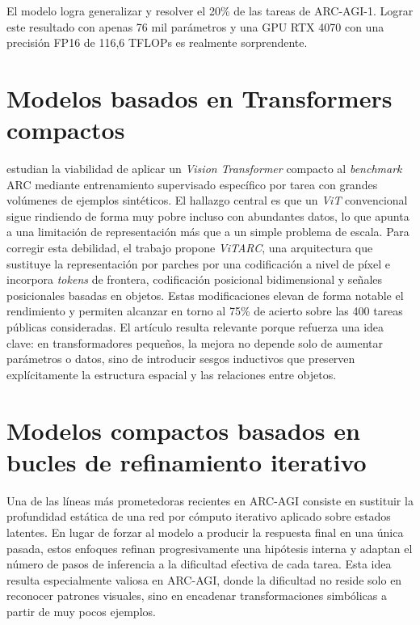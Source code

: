 \documentclass[11pt,a4paper,spanish]{book}
\numberwithin{equation}{chapter}
\numberwithin{figure}{chapter}
\begin{document}
\FloatBarrier

El modelo logra generalizar y resolver el 20\% de las tareas de ARC-AGI-1. Lograr este resultado con apenas 76 mil parámetros y una GPU RTX 4070 con una precisión 
FP16 de 116,6 TFLOPs es realmente sorprendente.

\section{Modelos basados en Transformers compactos}

 estudian la viabilidad de aplicar un \textit{Vision Transformer} 
compacto al \textit{benchmark} ARC mediante entrenamiento supervisado específico por tarea con grandes volúmenes de ejemplos sintéticos. 
El hallazgo central es que un \textit{ViT} convencional sigue rindiendo de forma muy pobre incluso con abundantes datos, 
lo que apunta a una limitación de representación más que a un simple problema de escala. Para corregir esta debilidad, el 
trabajo propone \textit{ViTARC}, una arquitectura que sustituye la representación por parches por una codificación a nivel de píxel e 
incorpora \textit{tokens} de frontera, codificación posicional bidimensional y señales posicionales basadas en objetos. 
Estas modificaciones elevan de forma notable el rendimiento y permiten alcanzar en torno al 75\% de acierto sobre las 400 
tareas públicas consideradas. El artículo resulta relevante porque refuerza una idea clave: 
en transformadores pequeños, la mejora no depende solo de aumentar parámetros o datos, sino de introducir sesgos inductivos 
que preserven explícitamente la estructura espacial y las relaciones entre objetos.




\section{Modelos compactos basados en bucles de refinamiento iterativo}

Una de las líneas más prometedoras recientes en ARC-AGI consiste en sustituir la profundidad 
estática de una red por cómputo iterativo aplicado sobre estados latentes. En lugar de forzar 
al modelo a producir la respuesta final en una única pasada, estos enfoques refinan progresivamente 
una hipótesis interna y adaptan el número de pasos de inferencia a la dificultad efectiva de cada tarea. 
Esta idea resulta especialmente valiosa en ARC-AGI, donde la dificultad no reside solo en reconocer 
patrones visuales, sino en encadenar transformaciones simbólicas a partir de muy pocos ejemplos.
\end{document}
